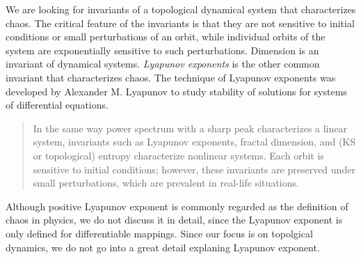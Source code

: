 \documentclass[10pt,twoside,draft]{book}
\begin{document}
We are looking for invariants of a topological dynamical system that characterizes chaos.
The critical feature of the invariants is that they are not sensitive to initial conditions or small perturbations of an orbit, while individual orbits of the system are exponentially sensitive to such perturbations. \citep{abarbanel} %
Dimension is an invariant of dynamical systems.
\textit{Lyapunov exponents} is the other common invariant that characterizes chaos.
The technique of Lyapunov exponents was developed by Alexander M. Lyapunov to study stability of solutions for systems of differential equations.
\begin{quote}
  In the same way power spectrum with a sharp peak characterizes a linear system, invariants such as Lyapunov exponents, fractal dimension, and (KS or topological) entropy characterize nonlinear systems.
  Each orbit is sensitive to initial conditions; however, these invariants are preserved under small perturbations, which are prevalent in real-life situations.
\end{quote}
Although positive Lyapunov exponent is commonly regarded as the definition of chaos \citep{kantz-schreiber} in physics, we do not discuss it in detail, since the Lyapunov exponent is only defined for differentiable mappings.
Since our focus is on topolgical dynamics, we do not go into a great detail explaning Lyapunov exponent.
\end{document}
